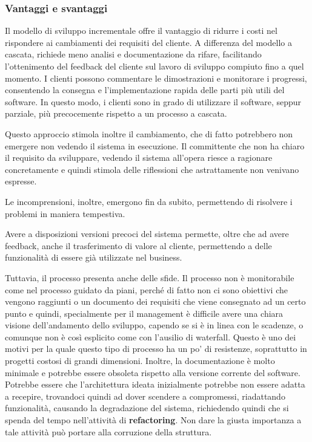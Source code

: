 \subsubsection{Vantaggi e svantaggi}

Il modello di sviluppo incrementale offre il vantaggio di ridurre i costi
nel rispondere ai cambiamenti dei requisiti del cliente. A differenza del
modello a cascata, richiede meno analisi e documentazione da rifare, facilitando
l'ottenimento del feedback del cliente sul lavoro di sviluppo compiuto fino a quel
momento. I clienti possono commentare le dimostrazioni e monitorare i progressi,
consentendo la consegna e l'implementazione rapida delle parti più utili del software.
In questo modo, i clienti sono in grado di utilizzare il software, seppur parziale,
più precocemente rispetto a un processo a cascata.

Questo approccio stimola inoltre il cambiamento, che di fatto potrebbero non 
emergere non vedendo il sistema in esecuzione. Il committente che non ha chiaro 
il requisito da sviluppare, vedendo il sistema all'opera riesce a ragionare concretamente
e quindi stimola delle riflessioni che astrattamente non venivano espresse.

Le incomprensioni, inoltre, emergono fin da subito, permettendo di risolvere i problemi 
in maniera tempestiva.

Avere a disposizioni versioni precoci del sistema permette, oltre che ad avere feedback,
anche il trasferimento di valore al cliente, permettendo a delle funzionalità di essere 
già utilizzate nel business.

Tuttavia, il processo presenta anche delle sfide. 
Il processo non è monitorabile come nel processo guidato da piani, perché di fatto 
non ci sono obiettivi che vengono raggiunti o un documento dei 
requisiti che viene consegnato ad un certo punto e quindi, specialmente per il 
management è difficile avere una chiara visione dell'andamento dello sviluppo, capendo 
se si è in linea con le scadenze, o comunque non è così esplicito come con 
l'ausilio di waterfall.
Questo è uno dei motivi per la quale questo tipo di processo ha un po' di resistenze, soprattutto 
in progetti costosi di grandi dimensioni.
Inoltre, la documentazione è molto minimale e potrebbe essere obsoleta rispetto 
alla versione corrente del software. Potrebbe essere che l'architettura ideata inizialmente 
potrebbe non essere adatta a recepire, trovandoci quindi ad dover scendere a compromessi,
riadattando funzionalità, causando la degradazione del sistema, richiedendo quindi 
che si spenda del tempo nell'attività di \textbf{refactoring}. Non dare la giusta importanza 
a tale attività può portare alla corruzione della struttura.

